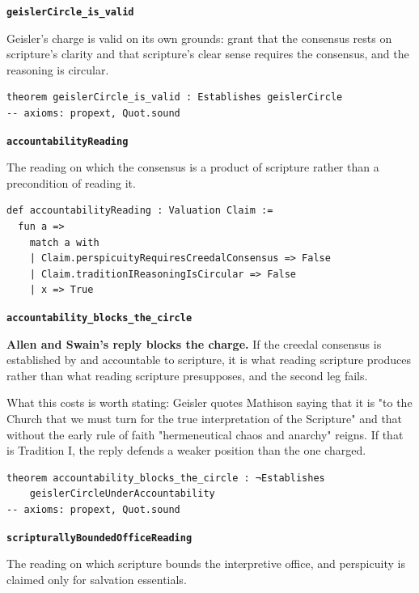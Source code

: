 \documentclass[11pt]{article}
\begin{document}
\par\medskip\noindent\textbf{\texttt{geisler\allowbreak{}Circle\_\allowbreak{}is\_\allowbreak{}valid}}\par\nobreak\noindent
Geisler's charge is valid on its own grounds: grant that the consensus rests on scripture's clarity and that scripture's clear sense requires the consensus, and the reasoning is circular.

{\small\begin{verbatim}
theorem geislerCircle_is_valid : Establishes geislerCircle
-- axioms: propext, Quot.sound
\end{verbatim}}
\par\medskip\noindent\textbf{\texttt{accountability\allowbreak{}Reading}}\par\nobreak\noindent
The reading on which the consensus is a product of scripture rather than a precondition of reading it.

{\small\begin{verbatim}
def accountabilityReading : Valuation Claim :=
  fun a =>
    match a with
    | Claim.perspicuityRequiresCreedalConsensus => False
    | Claim.traditionIReasoningIsCircular => False
    | x => True
\end{verbatim}}
\par\medskip\noindent\textbf{\texttt{accountability\_\allowbreak{}blocks\_\allowbreak{}the\_\allowbreak{}circle}}\par\nobreak\noindent
\textbf{Allen and Swain's reply blocks the charge.} If the creedal consensus is established by and accountable to scripture, it is what reading scripture produces rather than what reading scripture presupposes, and the second leg fails.

What this costs is worth stating: Geisler quotes Mathison saying that it is "to the Church that we must turn for the true interpretation of the Scripture" and that without the early rule of faith "hermeneutical chaos and anarchy" reigns. If that is Tradition I, the reply defends a weaker position than the one charged.

{\small\begin{verbatim}
theorem accountability_blocks_the_circle : ¬Establishes
    geislerCircleUnderAccountability
-- axioms: propext, Quot.sound
\end{verbatim}}
\par\medskip\noindent\textbf{\texttt{scripturally\allowbreak{}Bounded\allowbreak{}Office\allowbreak{}Reading}}\par\nobreak\noindent
The reading on which scripture bounds the interpretive office, and perspicuity is claimed only for salvation essentials.
\end{document}
